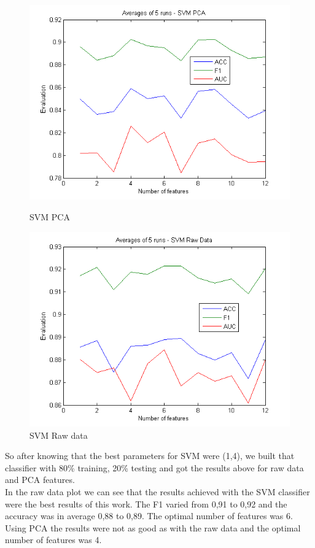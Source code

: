 \documentclass[english, a4paper, 12pt]{article}
\newcommand{\tab}{\hspace*{2em}}
\begin{document}
\begin{figure}[H]
	\centering
	\begin{minipage}[b]{0.45\linewidth}
		\includegraphics[scale= 0.5]{svm_pca.png}
		\caption{SVM PCA}	
		\label{fig:minipage1}
	\end{minipage}
	\quad	
	\begin{minipage}[b]{0.45\linewidth}
		\includegraphics[scale= 0.5]{svm_raw_data.png}
		\caption{SVM Raw data}
		\label{fig:minipage2}
	\end{minipage}	
\end{figure}

\tab So after knowing that the best parameters for SVM were (1,4), we built that classifier with 80\% training, 20\% testing and got the results above for raw data and PCA features.\smallskip\\
\tab In the raw data plot we can see that the results achieved with the SVM classifier were the best results of this work. The F1 varied from 0,91 to 0,92 and the accuracy was in average 0,88 to 0,89. The optimal number of features was 6.\smallskip\\
\tab Using PCA the results were not as good as with the raw data and the optimal number of features was 4.\smallskip\\
\end{document}
